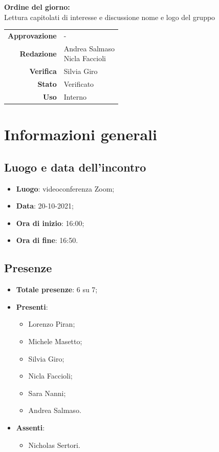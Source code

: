 \documentclass[11pt]{article}
\begin{document}
\begin{titlepage}
\begin{center}
			\large
			
			\vfill
			\textbf{Ordine del giorno:} \\
			Lettura capitolati di interesse e discussione nome e logo del gruppo
			\vfill
			
			\begin{tabular}{r|l}
				\textbf{Approvazione} &  -\\
				\textbf{Redazione} &  \parbox[t]{3.5cm}{Andrea Salmaso \\Nicla Faccioli}\\
				\textbf{Verifica} &  Silvia Giro\\
				\textbf{Stato} & Verificato \\
				\textbf{Uso} & Interno
			\end{tabular}
			\vfill
			
		\end{center}
	\end{titlepage}

	\newpage

	\section{Informazioni generali}
	\subsection{Luogo e data dell'incontro}
	\begin{itemize}
		\item \textbf{Luogo}: videoconferenza Zoom;
		\item \textbf{Data}: 20-10-2021;
		\item \textbf{Ora di inizio}: 16:00;
		\item \textbf{Ora di fine}: 16:50.
	\end{itemize}
	
	\subsection{Presenze}
	\begin{itemize}
		\item \textbf{Totale presenze}: 6 su 7;
		\item \textbf{Presenti}:
		\begin{itemize}
			\item Lorenzo Piran; 
			\item Michele Masetto;
			\item Silvia Giro;
			\item Nicla Faccioli;
			\item Sara Nanni;
			\item Andrea Salmaso.
			
		\end{itemize}
		\item \textbf{Assenti}:
			\begin{itemize}
				\item Nicholas Sertori.
			\end{itemize}
	\end{itemize}
	
\end{document}
